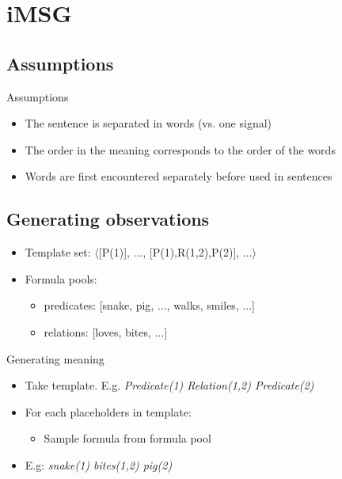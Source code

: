 \documentclass[11pt,a4paper,xcolor=dvipsnames]{beamer}
\begin{document}
\section{iMSG}
\subsection{Assumptions}
\begin{frame}{Assumptions}
\begin{itemize}
  \item The sentence is separated in words (vs. one signal)
  \item The order in the meaning corresponds to the order of the words
  \item Words are first encountered separately before used in sentences
\end{itemize}
\end{frame}
\subsection{Generating observations}%

\begin{frame}
\begin{itemize}
  \item Template set: $\langle$[P(1)], ..., [P(1),R(1,2),P(2)], ...$\rangle$
  \item Formula pools:
  \begin{itemize}
    \item predicates: [snake, pig, ..., walks, smiles, ...] %
    \item relations: [loves, bites, ...] %
  \end{itemize}
\end{itemize}
\end{frame}

\begin{frame}{Generating meaning}
\begin{itemize}
  \item Take template. E.g. \textit{ Predicate(1) Relation(1,2) Predicate(2) }
  \item For each placeholders in template:
  \begin{itemize}
    \item Sample formula from formula pool
  \end{itemize}
  \item E.g: \textit{ snake(1) bites(1,2) pig(2) }
\end{itemize}
\end{frame}
\end{document}
